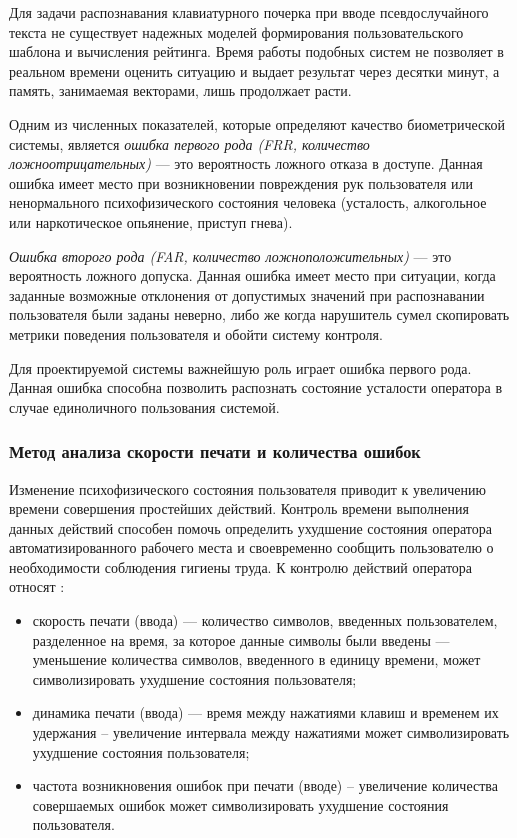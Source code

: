 Для задачи распознавания клавиатурного почерка при вводе псевдослучайного текста не существует надежных моделей формирования пользовательского шаблона и вычисления рейтинга. Время работы подобных систем не позволяет в реальном времени оценить ситуацию и выдает результат через десятки минут, а память, занимаемая векторами, лишь продолжает расти. \cite{keystroke}

Одним из численных показателей, которые определяют качество биометрической системы, является \textit{ошибка первого рода (FRR, количество ложноотрицательных)} --- это вероятность ложного отказа в доступе. Данная ошибка имеет место при возникновении повреждения рук пользователя или ненормального психофизического состояния человека (усталость, алкогольное или наркотическое опьянение, приступ гнева).\cite{keystroke}

\textit{Ошибка второго рода (FAR, количество ложноположительных)} --- это вероятность ложного допуска. Данная ошибка имеет место при ситуации, когда заданные возможные отклонения от допустимых значений при распознавании пользователя были заданы неверно, либо же когда нарушитель сумел скопировать метрики поведения пользователя и обойти систему контроля. \cite{keystroke}

Для проектируемой системы важнейшую роль играет ошибка первого рода. Данная ошибка способна позволить распознать состояние усталости оператора в случае единоличного пользования системой.

\subsubsection{Метод анализа скорости печати и количества ошибок}
Изменение психофизического состояния пользователя приводит к увеличению времени совершения простейших действий. Контроль времени выполнения данных действий способен помочь определить ухудшение состояния оператора автоматизированного рабочего места и своевременно сообщить пользователю о необходимости соблюдения гигиены труда. К контролю действий оператора относят \cite{typeFatigue}:
\begin{itemize}
\item скорость печати (ввода) --- количество символов, введенных пользователем, разделенное на время, за которое данные символы были введены --- уменьшение количества символов, введенного в единицу времени, может символизировать ухудшение состояния пользователя;
\item динамика печати (ввода) --- время между нажатиями клавиш и временем их удержания -- увеличение интервала между нажатиями может символизировать ухудшение состояния пользователя;
\item частота возникновения ошибок при печати (вводе) -- увеличение количества совершаемых ошибок может символизировать ухудшение состояния пользователя.
\end{itemize}

